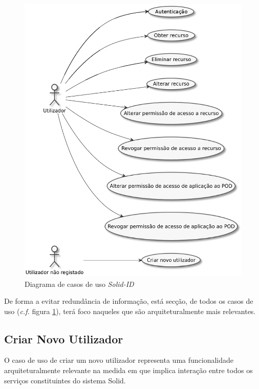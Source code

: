 \begin{figure}[H]
    \begin{center}
    \includegraphics[width=1 \textwidth]{figures/uc_diagram.eps}
    \caption{Diagrama de casos de uso
    \emph{Solid-ID}}
    \label{uc_diagram}
    \end{center}
\end{figure}

De forma a evitar redundância de informação, está secção, de todos os casos de uso (\emph{c.f.} figura \ref{uc_diagram}), terá foco naqueles que são arquiteturalmente mais relevantes.

\subsection{Criar Novo Utilizador \label{create_user_use_case_design}}

O caso de uso de criar um novo utilizador representa uma funcionalidade arquiteturalmente relevante na medida em que implica interação entre todos os serviços constituintes do sistema Solid.

